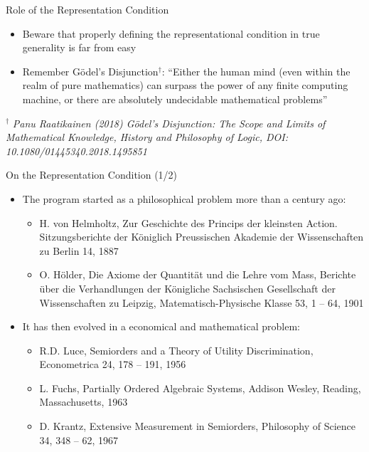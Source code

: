 \documentclass{beamer}
\begin{document}
\begin{frame}{\centerline{Role of the Representation Condition}}


\begin{itemize}
\item Beware that properly defining the representational condition in true generality is far from easy
\item Remember G\"{o}del's Disjunction$^\dag$: ``Either the human mind (even within the realm of pure mathematics) can surpass the power of any finite computing machine, or there are absolutely undecidable mathematical problems''
\end{itemize}

$^\dag$ \textit{\small
Panu Raatikainen (2018) G\"{o}del's Disjunction: The Scope and Limits of Mathematical Knowledge, History and Philosophy of Logic, DOI: 10.1080/01445340.2018.1495851}

\end{frame}

\begin{frame}{\centerline{On the Representation Condition (1/2)}}


\begin{itemize}
\item The program started as a philosophical problem more than a century ago:
\begin{itemize}
\item H. von Helmholtz, Zur Geschichte des Princips der kleinsten Action. Sitzungsberichte der K\"{o}niglich Preussischen Akademie der Wissenschaften zu Berlin 14, 1887
\item O. H\"{o}lder, Die Axiome der Quantit\"{a}t und die Lehre vom Mass, Berichte \"{u}ber die Verhandlungen der K\"{o}nigliche Sachsischen Gesellschaft der Wissenschaften zu Leipzig, Matematisch-Physische Klasse 53, 1 -- 64, 1901
\end{itemize}
\item It has then evolved in a economical and mathematical problem:
\begin{itemize}
\item R.D. Luce, Semiorders and a Theory of Utility Discrimination, Econometrica 24, 178 -- 191, 1956
\item L. Fuchs, Partially Ordered Algebraic Systems, Addison Wesley, Reading, Massachusetts, 1963
\item D. Krantz, Extensive Measurement in Semiorders, Philosophy of Science 34, 348 -- 62, 1967
\end{itemize}
\end{itemize}


\end{frame}
\end{document}
